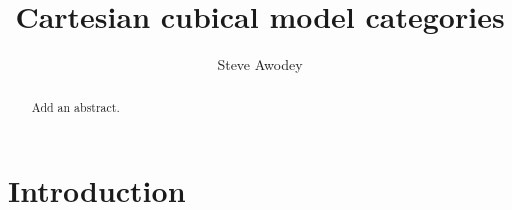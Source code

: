 \documentclass[12pt]{article}
\theoremstyle{remark}
\theoremstyle{definition}
\begin{document}

\title{Cartesian cubical model categories}
\author{Steve Awodey}
\maketitle

\begin{abstract}
Add an abstract.
\end{abstract}

\setcounter{tocdepth}{1}
\tableofcontents

\section*{Introduction}

%
%
%
%
%
%
%
% 




\end{document}
